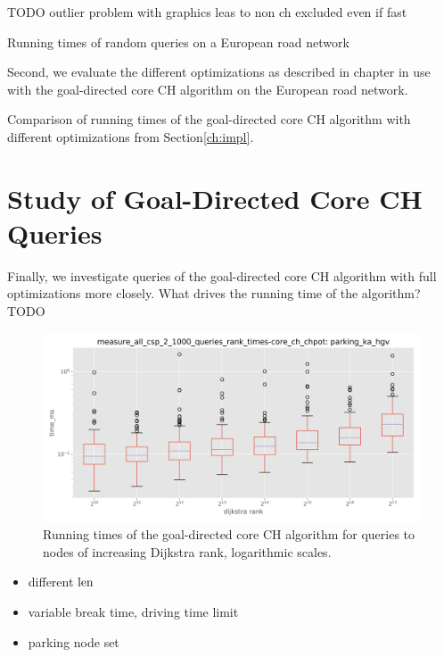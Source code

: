 TODO outlier problem with graphics leas to non ch excluded even if fast
\begin{table}[hbtp]
	\centering
	
	\caption{Running times of random queries on a European road network}
	\label{tbl:extensions_runtime_eur}
\end{table}

Second, we evaluate the different optimizations as described in chapter  in use with the goal-directed core CH algorithm on the European road network.

\begin{table}[hbtp]
	\centering
	
	\caption{Comparison of running times of the goal-directed core CH algorithm with different optimizations from Section\ref{ch:impl}.}
	\label{tbl:opt_runtime}
\end{table}

\section{Study of Goal-Directed Core CH Queries}
Finally, we investigate queries of the goal-directed core CH algorithm with full optimizations more closely. What drives the running time of the algorithm? TODO

\begin{figure}[hbtp]
	\centering
	\includegraphics[width=.95\textwidth]{plots/measure_all_csp_2_1000_queries_rank_times-core_ch_chpot-time_ms.png}
	\caption{Running times of the goal-directed core CH algorithm for queries to nodes of increasing Dijkstra rank, logarithmic scales.}
	\label{fig:rank_times}
\end{figure}

\begin{itemize}
	\item different $\operatorname{len}$
	\item variable break time, driving time limit
	\item parking node set
\end{itemize}

